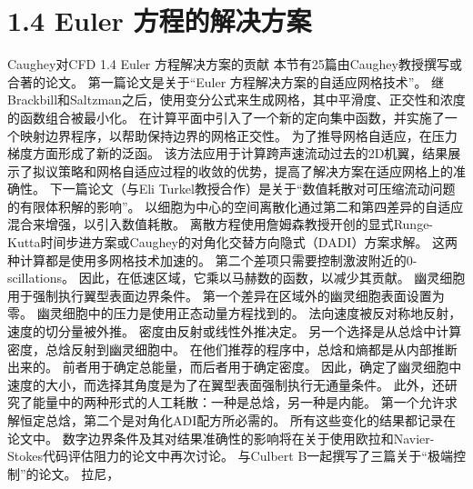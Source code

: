 \documentclass[UTF8,11pt,a4paper,openany,fontset=fandol]{ctexbook}
\begin{document}
\section{1.4 Euler 方程的解决方案}
Caughey对CFD 1.4 Euler 方程解决方案的贡献 本节有25篇由Caughey教授撰写或合著的论文。 第一篇论文是关于“Euler 方程解决方案的自适应网格技术”。 继Brackbill和Saltzman之后，使用变分公式来生成网格，其中平滑度、正交性和浓度的函数组合被最小化。 在计算平面中引入了一个新的定向集中函数，并实施了一个映射边界程序，以帮助保持边界的网格正交性。 为了推导网格自适应，在压力梯度方面形成了新的泛函。 该方法应用于计算跨声速流动过去的2D机翼，结果展示了拟议策略和网格自适应过程的收敛的优势，提高了解决方案在适应网格上的准确性。 下一篇论文（与Eli Turkel教授合作）是关于“数值耗散对可压缩流动问题的有限体积解的影响”。 以细胞为中心的空间离散化通过第二和第四差异的自适应混合来增强，以引入数值耗散。 离散方程使用詹姆森教授开创的显式Runge-Kutta时间步进方案或Caughey的对角化交替方向隐式（DADI）方案求解。 这两种计算都是使用多网格技术加速的。 第二个差项只需要控制激波附近的0-scillations。 因此，在低速区域，它乘以马赫数的函数，以减少其贡献。 幽灵细胞用于强制执行翼型表面边界条件。 第一个差异在区域外的幽灵细胞表面设置为零。 幽灵细胞中的压力是使用正态动量方程找到的。 法向速度被反对称地反射，速度的切分量被外推。 密度由反射或线性外推决定。 另一个选择是从总焓中计算密度，总焓反射到幽灵细胞中。 在他们推荐的程序中，总焓和熵都是从内部推断出来的。 前者用于确定总能量，而后者用于确定密度。 因此，确定了幽灵细胞中速度的大小，而选择其角度是为了在翼型表面强制执行无通量条件。 此外，还研究了能量中的两种形式的人工耗散：一种是总焓，另一种是内能。 第一个允许求解恒定总焓，第二个是对角化ADI配方所必需的。 所有这些变化的结果都记录在论文中。 数字边界条件及其对结果准确性的影响将在关于使用欧拉和Navier-Stokes代码评估阻力的论文中再次讨论。 与Culbert B一起撰写了三篇关于“极端控制”的论文。 拉尼，
\end{document}
